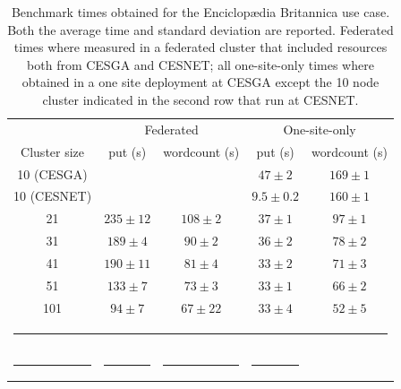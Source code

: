 \documentclass[oribibl]{llncs_Ibergrid2013}
\begin{document}
\begin{table}[h!]
\caption{Benchmark times obtained for the Enciclop{\ae}dia Britannica use case. Both the average time and standard deviation are reported. Federated times where measured in a federated cluster that included resources both from CESGA and CESNET; all one-site-only times where obtained in a one site deployment at CESGA except the 10 node cluster indicated in the second row that run at CESNET. }
\label{table:britannica}
%
\vspace{-0.5em}
%
\begin{center}
\begin{tabular}{ccccc}
\toprule
					& \multicolumn{2}{c}{Federated} 		& \multicolumn{2}{c}{One-site-only} \\
Cluster size				& put (s)		& wordcount (s) 	& put (s)		& wordcount (s)\\
\midrule
10 (CESGA)             			&        		&               	& $47\pm2$		& $169\pm1$\\
10 (CESNET)          			& 			&  			& $9.5\pm0.2$		& $160\pm1$\\
21                   			& $235\pm12$		& $108\pm2$     	& $37\pm1$		& $97\pm1$\\
31                   			& $189\pm4$		& $90\pm2$      	& $36\pm2$		& $78\pm2$\\
41                   			& $190\pm11$		& $81\pm4$      	& $33\pm2$		& $71\pm3$\\
51                   			& $133\pm7$		& $73\pm3$      	& $33\pm1$		& $66\pm2$\\
101                  			& $94\pm7$		& $67\pm22$      	& $33\pm4$		& $52\pm5$\\
%
\bottomrule
\multicolumn{5}{c}{\rule{0.98\textwidth}{0em}}\\
\rule{0.3\textwidth}{0cm} & \rule{0.2\textwidth}{0cm} & \rule{0.2\textwidth}{0cm} &  \rule{0.2\textwidth}{0cm} & \\
\end{tabular}
\end{center}
\end{table}
\end{document}
